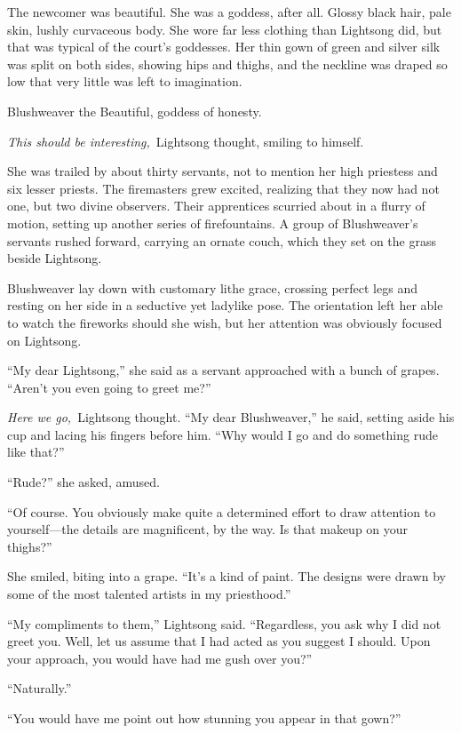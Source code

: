 The newcomer was beautiful. She was a goddess, after all. Glossy black hair, pale skin, lushly curvaceous body. She wore far less clothing than Lightsong did, but that was typical of the court’s goddesses. Her thin gown of green and silver silk was split on both sides, showing hips and thighs, and the neckline was draped so low that very little was left to imagination.

Blushweaver the Beautiful, goddess of honesty.

\textit{This should be interesting,}~Lightsong thought, smiling to himself.

She was trailed by about thirty servants, not to mention her high priestess and six lesser priests. The firemasters grew excited, realizing that they now had not one, but two divine observers. Their apprentices scurried about in a flurry of motion, setting up another series of firefountains. A group of Blushweaver’s servants rushed forward, carrying an ornate couch, which they set on the grass beside Lightsong.

Blushweaver lay down with customary lithe grace, crossing perfect legs and resting on her side in a seductive yet ladylike pose. The orientation left her able to watch the fireworks should she wish, but her attention was obviously focused on Lightsong.

“My dear Lightsong,” she said as a servant approached with a bunch of grapes. “Aren’t you even going to greet me?”

\textit{Here we go,}~Lightsong thought. “My dear Blushweaver,” he said, setting aside his cup and lacing his fingers before him. “Why would I go and do something rude like that?”

“Rude?” she asked, amused.

“Of course. You obviously make quite a determined effort to draw attention to yourself—the details are magnificent, by the way. Is that makeup on your thighs?”

She smiled, biting into a grape. “It’s a kind of paint. The designs were drawn by some of the most talented artists in my priesthood.”

“My compliments to them,” Lightsong said. “Regardless, you ask why I did not greet you. Well, let us assume that I had acted as you suggest I should. Upon your approach, you would have had me gush over you?”

“Naturally.”

“You would have me point out how stunning you appear in that gown?”

